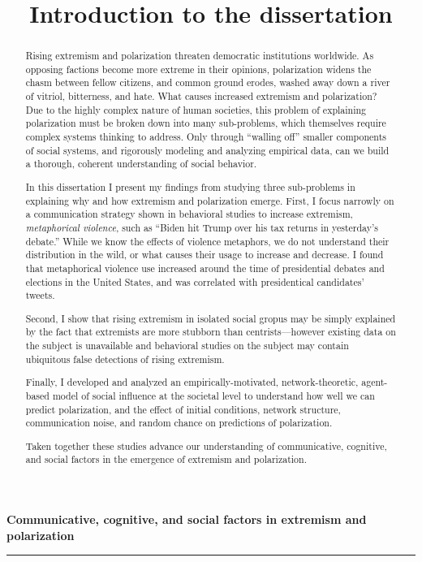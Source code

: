 \documentclass[12pt,letterpaper]{article}
\title{Introduction to the dissertation}
\date{}
\begin{document}

\vspace{-2.5in}
\textbf{Communicative, cognitive, and social factors in
extremism and polarization}
\begin{abstract}
  Rising extremism and polarization threaten democratic institutions worldwide.
  As opposing factions become more extreme in their opinions, polarization
  widens the chasm between fellow citizens, and common ground erodes, washed
  away down a river of vitriol, bitterness, and hate. What causes increased
  extremism and polarization? Due to the highly complex nature of human
  societies, this problem of explaining polarization must be broken down into
  many sub-problems, which themselves require complex systems thinking to
  address. Only through ``walling off'' smaller components of social systems,
  and rigorously modeling and analyzing empirical data,
  can we build a thorough, coherent understanding of social behavior.

  In this dissertation I present my findings from studying three
  sub-problems in explaining why and how extremism and polarization emerge.
  First, I focus narrowly on a communication strategy shown in behavioral
  studies to increase extremism, \emph{metaphorical violence}, such as 
  ``Biden hit Trump over his tax returns in yesterday's debate.'' While we know
  the effects of violence metaphors, we do not understand their distribution
  in the wild, or what causes their usage to increase and decrease. I found
  that metaphorical violence use increased around the time of presidential
  debates and elections in the United States, and was correlated with 
  presidentical candidates' tweets. 

  Second, I show that rising extremism
  in isolated social gropus may be simply explained by the fact that
  extremists are more stubborn than centrists---however existing data on the
  subject is unavailable and behavioral studies on the subject may
  contain ubiquitous false detections of rising extremism. 

  Finally, I developed
  and analyzed an empirically-motivated, network-theoretic, agent-based model of 
  social influence at the societal level to understand how well we can 
  predict polarization, and the effect of initial conditions, network structure,
  communication noise, and random chance on predictions of polarization.

  Taken together these studies advance our understanding of communicative,
  cognitive, and social factors in the emergence of extremism and polarization.
\end{abstract}
\hrule
\vspace{2em}
\end{document}
